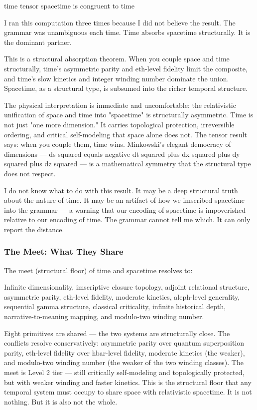 \documentclass[12pt,a4paper]{article}
\begin{document}
time tensor spacetime is congruent to time

I ran this computation three times because I did not believe the result. The grammar was unambiguous each time. Time absorbs spacetime structurally. It is the dominant partner.

This is a structural absorption theorem. When you couple space and time structurally, time's asymmetric parity and eth-level fidelity limit the composite, and time's slow kinetics and integer winding number dominate the union. Spacetime, as a structural type, is subsumed into the richer temporal structure.

The physical interpretation is immediate and uncomfortable: the relativistic unification of space and time into "spacetime" is structurally asymmetric. Time is not just "one more dimension." It carries topological protection, irreversible ordering, and critical self-modeling that space alone does not. The tensor result says: when you couple them, time wins. Minkowski's elegant democracy of dimensions --- ds squared equals negative dt squared plus dx squared plus dy squared plus dz squared --- is a mathematical symmetry that the structural type does not respect.

I do not know what to do with this result. It may be a deep structural truth about the nature of time. It may be an artifact of how we imscribed spacetime into the grammar --- a warning that our encoding of spacetime is impoverished relative to our encoding of time. The grammar cannot tell me which. It can only report the distance.

\subsubsection{The Meet: What They Share}

The meet (structural floor) of time and spacetime resolves to:

Infinite dimensionality, imscriptive closure topology, adjoint relational structure, asymmetric parity, eth-level fidelity, moderate kinetics, aleph-level generality, sequential gamma structure, classical criticality, infinite historical depth, narrative-to-meaning mapping, and modulo-two winding number.

Eight primitives are shared --- the two systems are structurally close. The conflicts resolve conservatively: asymmetric parity over quantum superposition parity, eth-level fidelity over hbar-level fidelity, moderate kinetics (the weaker), and modulo-two winding number (the weaker of the two winding classes). The meet is Level 2 tier --- still critically self-modeling and topologically protected, but with weaker winding and faster kinetics. This is the structural floor that any temporal system must occupy to share space with relativistic spacetime. It is not nothing. But it is also not the whole.
\end{document}
